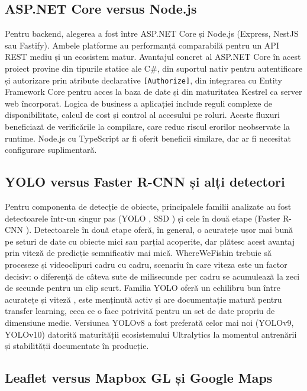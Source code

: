 \subsection{ASP.NET Core versus Node.js}

Pentru backend, alegerea a fost între ASP.NET Core și Node.js (Express, NestJS sau Fastify). Ambele platforme au performanță comparabilă pentru un API REST mediu și un ecosistem matur. Avantajul concret al ASP.NET Core în acest proiect provine din tipurile statice ale C\#, din suportul nativ pentru autentificare și autorizare prin atribute declarative \texttt{[Authorize]}, din integrarea cu Entity Framework Core pentru acces la baza de date și din maturitatea Kestrel ca server web încorporat. Logica de business a aplicației include reguli complexe de disponibilitate, calcul de cost și control al accesului pe roluri. Aceste fluxuri beneficiază de verificările la compilare, care reduc riscul erorilor neobservate la runtime. Node.js cu TypeScript ar fi oferit beneficii similare, dar ar fi necesitat configurare suplimentară.

\subsection{YOLO versus Faster R-CNN și alți detectori}

Pentru componenta de detecție de obiecte, principalele familii analizate au fost detectoarele într-un singur pas (YOLO \citep{redmon2016yolo}, SSD \citep{liu2016ssd}) și cele în două etape (Faster R-CNN \citep{ren2015fasterrcnn}). Detectoarele în două etape oferă, în general, o acuratețe ușor mai bună pe seturi de date cu obiecte mici sau parțial acoperite, dar plătesc acest avantaj prin viteză de predicție semnificativ mai mică. WhereWeFishin trebuie să proceseze și videoclipuri cadru cu cadru, scenariu în care viteza este un factor decisiv: o diferență de câteva sute de milisecunde per cadru se acumulează la zeci de secunde pentru un clip scurt. Familia YOLO oferă un echilibru bun între acuratețe și viteză \citep{ultralytics}, este menținută activ și are documentație matură pentru transfer learning, ceea ce o face potrivită pentru un set de date propriu de dimensiune medie. Versiunea YOLOv8 a fost preferată celor mai noi (YOLOv9, YOLOv10) datorită maturității ecosistemului Ultralytics la momentul antrenării și stabilității documentate în producție.

\subsection{Leaflet versus Mapbox GL și Google Maps}

